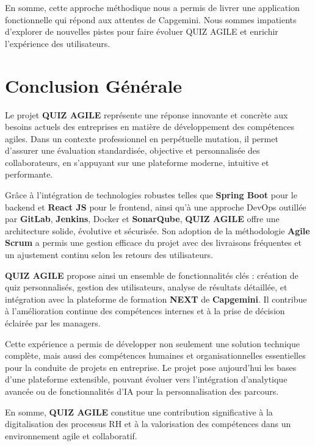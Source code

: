 \documentclass[12pt,a4paper,twoside,openright]{report}
\begin{document}
En somme, cette approche méthodique nous a permis de livrer une
application fonctionnelle qui répond aux attentes de Capgemini. Nous
sommes impatients d'explorer de nouvelles pistes pour faire évoluer QUIZ
AGILE et enrichir l'expérience des utilisateurs.

\hypertarget{conclusion-guxe9nuxe9rale-1}{%
\section{Conclusion Générale}\label{conclusion-guxe9nuxe9rale-1}}

\protect\hypertarget{_Toc204179750}{}{}Le projet \textbf{QUIZ AGILE}
représente une réponse innovante et concrète aux besoins actuels des
entreprises en matière de développement des compétences agiles. Dans un
contexte professionnel en perpétuelle mutation, il permet d'assurer une
évaluation standardisée, objective et personnalisée des collaborateurs,
en s'appuyant sur une plateforme moderne, intuitive et performante.

Grâce à l'intégration de technologies robustes telles que \textbf{Spring
Boot} pour le backend et \textbf{React JS} pour le frontend, ainsi qu'à
une approche DevOps outillée par \textbf{GitLab}, \textbf{Jenkins},
Docker et \textbf{SonarQube}, \textbf{QUIZ AGILE} offre une architecture
solide, évolutive et sécurisée. Son adoption de la méthodologie
\textbf{Agile Scrum} a permis une gestion efficace du projet avec des
livraisons fréquentes et un ajustement continu selon les retours des
utilisateurs.

\textbf{QUIZ AGILE} propose ainsi un ensemble de fonctionnalités clés :
création de quiz personnalisés, gestion des utilisateurs, analyse de
résultats détaillée, et intégration avec la plateforme de formation
\textbf{NEXT} de \textbf{Capgemini}. Il contribue à l'amélioration
continue des compétences internes et à la prise de décision éclairée par
les managers.

Cette expérience a permis de développer non seulement une solution
technique complète, mais aussi des compétences humaines et
organisationnelles essentielles pour la conduite de projets en
entreprise. Le projet pose aujourd'hui les bases d'une plateforme
extensible, pouvant évoluer vers l'intégration d'analytique avancée ou
de fonctionnalités d'IA pour la personnalisation des parcours.

En somme, \textbf{QUIZ AGILE} constitue une contribution significative à
la digitalisation des processus RH et à la valorisation des compétences
dans un environnement agile et collaboratif.
\end{document}
